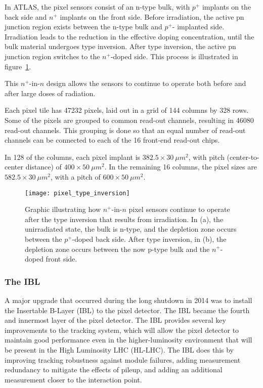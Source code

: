 In ATLAS, the pixel sensors consist of an n-type bulk, with $p^+$ implants on the back side and $n^+$ implants on the front side.
Before irradiation, the active pn junction region exists between the n-type bulk and $p^+$- implanted side.
Irradiation leads to the reduction in the effective doping concentration,
until the bulk material undergoes type inversion.
After type inversion, the active pn junction region switches to the $n^+$-doped side.\cite{pixels-2008}
This process is illustrated in figure~\ref{fig:pixel_type_inversion}.

This $n^+$-in-$n$ design allows the sensors to continue to operate both before and after large doses of radiation.

Each pixel tile has 47232 pixels, laid out in a grid of 144 columns by 328 rows.
Some of the pixels are grouped to common read-out channels, resulting in 46080 read-out channels.
This grouping is done so that an equal number of read-out channels can be connected to each of
the 16 front-end read-out chips.\cite{pixels-2008}

In 128 of the columns, each pixel implant is $382.5\times30~\mu m^2$, with pitch (center-to-center distance) of  $400\times50~\mu m^2$.
In the remaining 16 columns, the pixel sizes are $582.5\times30~\mu m^2$, with a pitch of  $600\times50~\mu m^2$.\cite{pixels-2008}

\begin{figure}[h]
\texttt{[image: pixel\_type\_inversion]}
\caption{Graphic illustrating how $n^+$-in-$n$ pixel sensors continue to operate after the type inversion that results from irradiation.
In (a), the unirradiated state, the bulk is n-type, and the depletion zone occurs between the $p^+$-doped back side.
After type inversion, in (b), the depletion zone occurs between the now p-type bulk and the $n^+$-doped front side.
\cite{pixels-2008}}
\label{fig:pixel_type_inversion}
\end{figure}

\subsubsection{The IBL}
A major upgrade that occurred during the long shutdown in 2014 was to install the Insertable B-Layer (IBL) to the pixel detector.
The IBL became the fourth and innermost layer of the pixel detector.
The IBL provides several key improvements to the tracking system, which will allow the pixel detector to maintain
good performance even in the higher-luminosity environment that will be present in the High Luminosity LHC (HL-LHC).\cite{ibl-tdr}
The IBL does this by improving tracking robustness against module failures,
adding measurement redundancy to mitigate the effects of pileup,
and adding an additional measurement closer to the interaction point.\cite{ibl-tdr}

